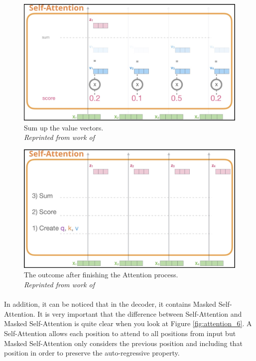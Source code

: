 \begin{figure}[H]
  \centering
  \caption[Sum up the value vectors.]{Sum up the value vectors. \\\hspace{\textwidth} \emph{Reprinted from work of \citeauthor{alammar_2018} \citeyear{alammar_2018}}}\label{fig:attention_4}
  \includegraphics[scale = 0.3]{figures/attention_4.jpg}  
\end{figure}
\begin{figure}[H]
  \centering
  \caption[The outcome after finishing the Attention process.]{The outcome after finishing the Attention process. \\\hspace{\textwidth} \emph{Reprinted from work of \citeauthor{alammar_2018} \citeyear{alammar_2018}}}\label{fig:attention_5}
  \includegraphics[scale = 0.3]{figures/attention_5.jpg}  
\end{figure}

\paragraph{}
In addition, it can be noticed that in the decoder, it contains Masked Self-Attention. It is very important that the difference between Self-Attention and Masked Self-Attention is quite clear when you look at Figure \ref{fig:attention_6}. A Self-Attention allows each position to attend to all positions from input but Masked Self-Attention only considers the previous position and including that position in order to preserve the auto-regressive property.

